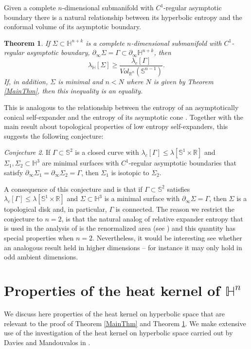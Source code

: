 \documentclass{amsart}
\newtheorem{thm}{Theorem}[section]
\theoremstyle{definition}
\theoremstyle{remark}
\newtheorem{conj}[thm]{Conjecture}
\numberwithin{equation}{section}
\newcommand{\Real}{\mathbb R}
\begin{document}
Given a complete $n$-dimensional submanifold with $C^1$-regular asymptotic boundary there is a natural relationship between its hyperbolic entropy and the conformal volume of its asymptotic boundary.
\begin{thm}\label{MobEntropyThm}
	If $\Sigma\subset \mathbb{H}^{n+k}$ is a complete $n$-dimensional submanifold with $C^1$-regular asymptotic boundary, $\partial_\infty \Sigma=\Gamma\subset \partial_\infty \mathbb{H}^{n+k}$, then
	$$
    	\lambda_{\mathbb{H}}[\Sigma]\geq\frac{\lambda_{c}[\Gamma]}{Vol_{\Real^n}(\mathbb{S}^{n-1})}.
	$$
	If, in addition,   $\Sigma$ is minimal and $n<N$ where $N$ is given by Theorem \ref{MainThm}, then this inequality is an equality.
\end{thm}
This is analogous to the relationship between the entropy of an asymptotically conical self-expander and the entropy of its asymptotic cone \cite[Lemma 3.5]{BWCompactness}. 
Together with the main result \cite{BWTopUniq} about topological properties of low entropy self-expanders, this suggests the  following conjecture:
\begin{conj}\label{MainConj}
	  If $\Gamma\subset \mathbb{S}^{2}$ is a closed curve with $\lambda_{c}[\Gamma]\leq \lambda[\mathbb{S}^{1}\times \Real]$ and $\Sigma_1,\Sigma_2\subset \mathbb{H}^{3}$ are  minimal surfaces with $C^1$-regular asymptotic boundaries that satisfy $\partial_\infty \Sigma_1=\partial_\infty \Sigma_2=\Gamma$, then $\Sigma_1$ is isotopic to $\Sigma_2$. 
\end{conj}
A consequence of this conjecture and \cite{andersonCompleteMinimalHypersurfaces1983} is that if $\Gamma\subset \mathbb{S}^2$ satisfies $\lambda_{c}[\Gamma]\leq \lambda[\mathbb{S}^{1}\times \Real]$ and $\Sigma\subset \mathbb{H}^3$ is a minimal surface with $\partial_\infty \Sigma=\Gamma$, then $\Sigma$ is a topological disk and, in particular, $\Gamma$ is connected.  The reason we restrict the conjecture to $n=2$, is that the natural analog of relative expander entropy that is used in the analysis of \cite{BWTopUniq} is the renormalized area (see \cite{grahamConformalAnomalySubmanifold1999, Alexakis2010}) and this quantity has special properties when $n=2$.    Nevertheless, it would be interesting see whether an analogous result held in higher dimensions -- for instance it may only hold in odd ambient dimensions.
	
\section{Properties of the heat kernel of $\mathbb{H}^n$}
We discuss here properties of the heat kernel on hyperbolic space that are relevant to the proof of Theorem \ref{MainThm} and Theorem \ref{MobEntropyThm}.  We make extensive use of the investigation of the heat kernel on hyperbolic space carried out by Davies and Mandouvalos in \cite{daviesHeatKernelBounds1988}.
\end{document}
